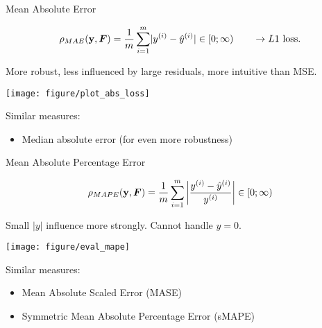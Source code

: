 \documentclass[11pt,compress,t,notes=noshow, xcolor=table]{beamer}
\begin{document}
\begin{vbframe}{Mean Absolute Error}

$$ 
\rho_{MAE}(\mathbf{y}, \bm{F}) = \frac{1}{m} \sum\limits_{i=1}^m \rvert y^{(i)}- \hat{y}^{(i)} \rvert \in [0;\infty) \qquad \rightarrow L1 
\text{ loss}.
$$

\begin{minipage}[c]{0.33\textwidth}
  \raggedright
  \small
  More robust, less influenced by large residuals, more intuitive than MSE.
\end{minipage}%
\begin{minipage}[c]{0.67\textwidth}
  \begin{knitrout}\scriptsize
  \color{fgcolor}
  {\texttt{[image: figure/plot\_abs\_loss]}}
\end{knitrout}
\end{minipage}

\small
Similar measures:

\begin{itemize}
  \small
  \item Median absolute error (for even more robustness)
\end{itemize}

\end{vbframe}


\begin{vbframe}{Mean Absolute Percentage Error}


$$ 
\rho_{MAPE}(\mathbf{y}, \bm{F}) = \frac{1}{m} \sum\limits_{i=1}^m \left\rvert \frac{y^{(i)}- \hat{y}^{(i)}}{y^{(i)}} \right\rvert \in [0;\infty) 
$$

\vfill

\begin{minipage}[c]{0.33\textwidth}
  \raggedright
  \small
  
Small $|y|$ influence more strongly. Cannot handle $y=0$.
\end{minipage}%
\begin{minipage}[c]{0.67\textwidth}
  \begin{knitrout}\scriptsize
  \color{fgcolor}
  {\texttt{[image: figure/eval\_mape]}}
\end{knitrout}
\end{minipage}

\vfill

\small
Similar measures:

\begin{itemize}
  \small
  \item Mean Absolute Scaled Error (MASE)
  \item Symmetric Mean Absolute Percentage Error (sMAPE)
\end{itemize}

\end{vbframe}
\end{document}
